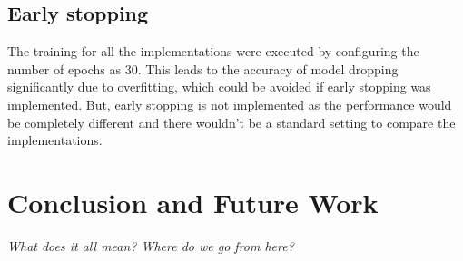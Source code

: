 \section{Early stopping}
The training for all the implementations were executed by configuring the number of epochs as 30. This leads to the accuracy of model dropping significantly due to overfitting, which could be avoided if early stopping was implemented.
But, early stopping is not implemented as the performance would be completely different and there wouldn't be a standard setting to compare the implementations.



\chapter{Conclusion and Future Work}
\textit{What does it all mean? Where do we go from here?}
